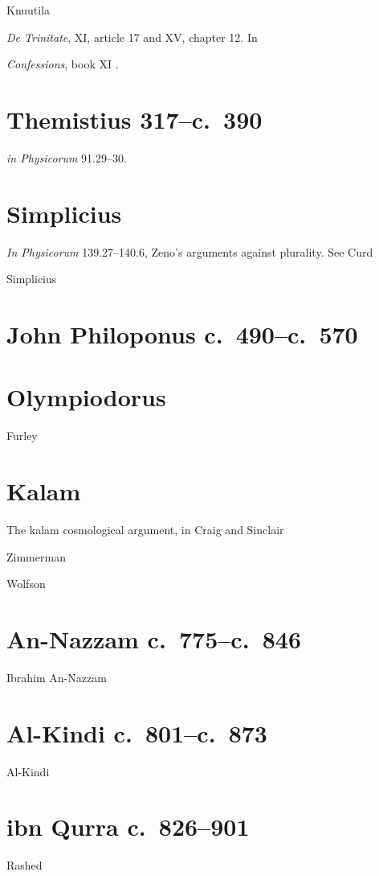 \documentclass{amsart}
\theoremstyle{definition}
\begin{document}
Knuutila \cite{knuutila}

{\em De Trinitate}, XI, article 17 and XV, chapter 12. In \cite{trinity815}

{\em Confessions}, book XI \cite{confessions}.

\section{Themistius 317--c.~390}
{\em in Physicorum} 91.29--30.



\section{Simplicius}
{\em In Physicorum} 139.27--140.6, Zeno's arguments against plurality. See Curd \cite[pp.~171--186]{monism}

Simplicius \cite{corollaries}


\section{John Philoponus c.~490--c.~570}


\section{Olympiodorus}
Furley \cite{furley1982}


\section{Kalam}
The kalam cosmological argument, in Craig and Sinclair \cite{kalam}

Zimmerman \cite{zimmerman}

Wolfson \cite{wolfsonIV}

\section{An-Nazzam c.~775--c.~846}
Ibrahim An-Nazzam

\section{Al-Kindi c.~801--c.~873}
Al-Kindi \cite{alkindi}

\section{ibn Qurra c.~826--901}
Rashed \cite{rashed2009}
\end{document}

